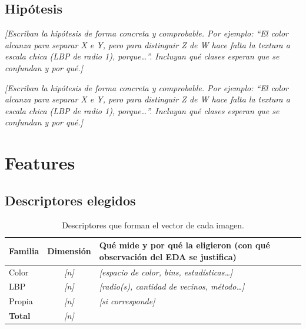 \documentclass[11pt,a4paper]{article}
\newcommand{\completar}[1]{\textcolor{gris}{\textit{[#1]}}}
\begin{document}
\subsection{Hipótesis}
 
\begin{hipotesis}
  \completar{Escriban la hipótesis de forma concreta y comprobable. Por ejemplo: ``El color alcanza para separar X e Y, pero para distinguir Z de W hace falta la textura a escala chica (LBP de radio 1), porque\ldots''. Incluyan qué clases esperan que se confundan y por qué.}
\end{hipotesis}

\begin{hipotesis}
  \completar{Escriban la hipótesis de forma concreta y comprobable. Por ejemplo: ``El color alcanza para separar X e Y, pero para distinguir Z de W hace falta la textura a escala chica (LBP de radio 1), porque\ldots''. Incluyan qué clases esperan que se confundan y por qué.}
\end{hipotesis}
 
\section{Features}
 
\subsection{Descriptores elegidos}
 
\begin{table}[H]
  \centering
  \label{tab:features}
  \begin{tabularx}{\linewidth}{lcX}
    \toprule
    Familia & Dimensión & Qué mide y por qué la eligieron (con qué observación del EDA se justifica) \\
    \midrule
    Color & \completar{n} & \completar{espacio de color, bins, estadísticas\ldots} \\
    LBP & \completar{n} & \completar{radio(s), cantidad de vecinos, método\ldots} \\
    Propia & \completar{n} & \completar{si corresponde} \\
    \midrule
    \textbf{Total} & \completar{n} & \\
    \bottomrule
  \end{tabularx}
  \caption{Descriptores que forman el vector de cada imagen.}
\end{table}
 
\end{document}
